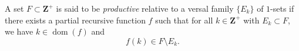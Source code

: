 A set $F \subset \mathbf{Z}^+$ is said to be \textit{productive} relative to a versal family $\{E_k\}$ of $1$-sets if there exists a partial recursive function $f$ such that for all $k \in \mathbf{Z}^+$ with $E_k \subset F$, we have $k \in \operatorname{dom}(f)$ and
$$f(k) \in F \setminus E_k.$$
